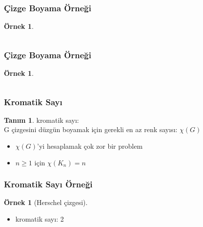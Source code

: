 \documentclass[dvipsnames]{beamer}
\theoremstyle{definition}
\newtheorem{tanim}[theorem]{Tanım}
\theoremstyle{example}
\newtheorem{ornek}[theorem]{Örnek}
\theoremstyle{plain}
\begin{document}
\begin{frame}
  \frametitle{Çizge Boyama Örneği}

  \begin{ornek}
    \begin{columns}
      \begin{center}
      \end{center}

      \begin{center}
      \end{center}
    \end{columns}
  \end{ornek}
\end{frame}

\begin{frame}
  \frametitle{Çizge Boyama Örneği}

  \begin{ornek}
    \begin{columns}
      \begin{center}
      \end{center}

      \begin{center}
      \end{center}
    \end{columns}
  \end{ornek}
\end{frame}

\begin{frame}
  \frametitle{Kromatik Sayı}

  \begin{tanim}
    \alert{kromatik sayı}:\\
    G çizgesini düzgün boyamak için gerekli en az renk sayısı: $\chi (G)$
  \end{tanim}

  \pause
  \begin{itemize}
     \item $\chi (G)$'yi hesaplamak çok zor bir problem
     \item $n \geq 1$ için $\chi (K_n) = n$
  \end{itemize}
\end{frame}

\begin{frame}
  \frametitle{Kromatik Sayı Örneği}

  \begin{ornek}[Herschel çizgesi]
    \begin{center}
    \end{center}

    \begin{itemize}
      \item kromatik sayı: 2
    \end{itemize}
  \end{ornek}
\end{frame}
\end{document}
